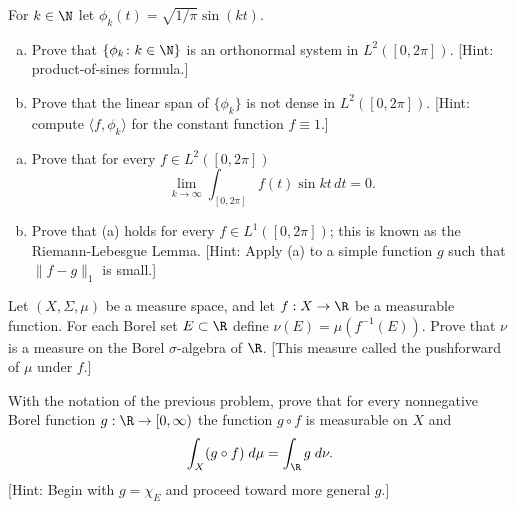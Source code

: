 


\begin{hw} \label{hw:55}
For $k \in \N$ let $\phi_k(t)= \sqrt{1/\pi} \sin(k t)$. 
	\begin{enumerate}[(a)]
	\item Prove that $\{ \phi_k \colon k \in \N \}$ is an orthonormal system in $L^2([0, 2\pi])$.  [Hint: product-of-sines formula.]
	\item Prove that the linear span of $\{ \phi_k \}$ is not dense in $L^2([0, 2\pi])$. [Hint: compute $\langle f, \phi_k \rangle$ for the constant function $f \equiv 1$.] \\
	\end{enumerate}
\end{hw}


\begin{hw} \label{hw:56} \hfill
\begin{enumerate}[(a)]
\item Prove that for every $f\in L^2([0, 2\pi])$ 
        \[
        \lim_{k \to \infty} \int_{[0, 2\pi]} f(t)  \sin kt\,dt= 0.
        \]
\item Prove that (a) holds for every $f \in L^1([0, 2\pi])$; this is known as the Riemann-Lebesgue Lemma. [Hint: Apply (a) to a simple function $g$ such that $\|f - g\|_1$ is small.] \\
\end{enumerate}
\end{hw}






\begin{hw} \label{hw:57}
Let $(X,\Sigma,\mu)$ be a measure space, and let $f: X \to \R$ be a measurable function. For each Borel set $E \subset \R$ define $\nu(E)= \mu(f^{-1}(E))$. Prove that $\nu$ is a measure on the Borel $\sigma$-algebra of $\R$. [This measure called the pushforward of $\mu$ under $f$.] \\
\end{hw}


\begin{hw} \label{hw:58}
With the notation of the previous problem, prove that for every nonnegative Borel function $g: \R  \to [0, \infty)$ the function $g \circ f$ is measurable on $X$ and
        \[
        \int_X (g \circ f) \;d\mu= \int_{\R} g \;d\nu.
        \]
[Hint: Begin with $g= \chi_E$ and proceed toward more general $g$.] \\
\end{hw}



